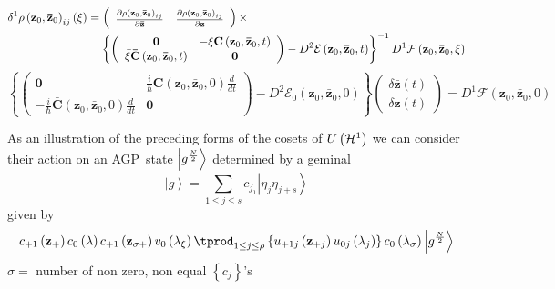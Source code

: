 \documentclass[aps,preprint]{revtex4}
\begin{document}
\begin{align}
& \delta ^{1}\mathbf{\rho }\left( \mathbf{z}_{0},\mathbf{\bar{z}}_{0}\right)
_{ij}\left( \xi \right) =\left( 
\begin{array}{cc}
\frac{\partial \rho \left( \mathbf{z}_{0},\mathbf{\bar{z}}_{0}\right) _{ij}}{%
\partial \mathbf{\bar{z}}} & \frac{\partial \rho \left( \mathbf{z}_{0},%
\mathbf{\bar{z}}_{0}\right) _{ij}}{\partial \mathbf{z}}%
\end{array}%
\right) \times  \notag \\
& \qquad \qquad \qquad \qquad \left\{ \left( 
\begin{array}{cc}
\mathbf{0} & -\xi \mathbf{C}\left( \mathbf{z}_{0},\mathbf{\bar{z}}%
_{0},t\right) \\ 
\bar{\xi}\mathbf{\bar{C}}\left( \mathbf{z}_{0},\mathbf{\bar{z}}_{0},t\right)
& \mathbf{0}%
\end{array}%
\right) -D^{2}\mathcal{E}\left( \mathbf{z}_{0},\mathbf{\bar{z}}_{0},t\right)
\right\} ^{-1}D^{1}\mathcal{F}\left( \mathbf{z}_{0},\mathbf{\bar{z}}_{0},\xi
\right)
\end{align}%
\begin{equation}
\left\{ \left( 
\begin{array}{cc}
\mathbf{0} & \frac{i}{\hslash }\mathbf{C}\left( \mathbf{z}_{0},\mathbf{\bar{z%
}}_{0},0\right) \frac{d}{dt} \\ 
-\frac{i}{\hslash }\mathbf{\bar{C}}\left( \mathbf{z}_{0},\mathbf{\bar{z}}%
_{0},0\right) \frac{d}{dt} & \mathbf{0}%
\end{array}%
\right) -D^{2}\mathcal{E}_{0}\left( \mathbf{z}_{0},\mathbf{\bar{z}}%
_{0},0\right) \right\} \left( 
\begin{array}{c}
\delta \mathbf{\bar{z}}\left( t\right) \\ 
\delta \mathbf{z}\left( t\right)%
\end{array}%
\right) =D^{1}\mathcal{F}\left( \mathbf{z}_{0},\mathbf{\bar{z}}_{0},0\right)
\end{equation}

As an illustration of the preceding forms of the cosets of $U\left( \mathcal{%
H}^{1}\right) $ we can consider their action on an AGP\ state $\left\vert g^{%
\frac{N}{2}}\right\rangle $ determined by a geminal 
\begin{equation}
\left\vert g\right\rangle =\sum_{1\leq j\leq s}c_{j_{1}}\left\vert \eta
_{j}\eta _{j+s}\right\rangle
\end{equation}%
given by 
\begin{equation}
c_{+1}\left( \mathbf{z}_{+}\right) c_{0}\left( \mathbf{\lambda }\right)
c_{+1}\left( \mathbf{z}_{\sigma +}\right) v_{0}\left( \mathbf{\lambda }_{\xi
}\right) \tprod_{1\leq j\leq \rho }\left\{ u_{+1j}\left( \mathbf{z}%
_{+j}\right) u_{0j}\left( \mathbf{\lambda }_{j}\right) \right\} c_{0}\left( 
\mathbf{\lambda }_{\sigma }\right) \left\vert g^{\frac{N}{2}}\right\rangle
\end{equation}%
$\sigma =$ number of non zero, non equal $\left\{ c_{j}\right\} $'s
\end{document}
